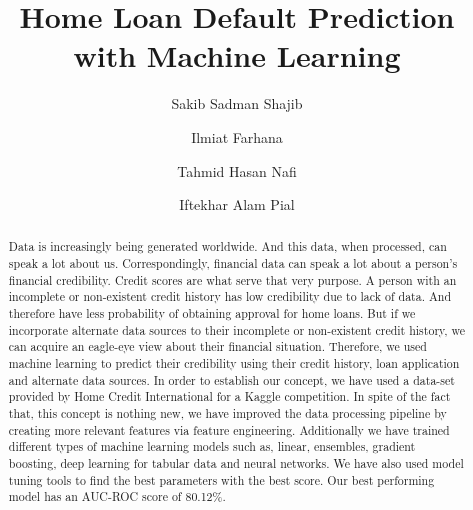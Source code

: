 \documentclass[sigconf, nonacm]{acmart}
\begin{document}
\title{Home Loan Default Prediction with Machine Learning}

\author{Sakib Sadman Shajib}

\author{Ilmiat Farhana}

\author{Tahmid Hasan Nafi}

\author{Iftekhar Alam Pial}

\begin{abstract}

Data is increasingly being generated worldwide. And this data, when processed, can speak a lot about us. Correspondingly, financial data can speak a lot about a person's financial credibility. Credit scores are what serve that very purpose. A person with an incomplete or non-existent credit history has low credibility due to lack of data. And therefore have less probability of obtaining approval for home loans. But if we incorporate alternate data sources to their incomplete or non-existent credit history, we can acquire an eagle-eye view about their financial situation. Therefore, we used machine learning to predict their credibility using their credit history, loan application and alternate data sources. In order to establish our concept, we have used a data-set provided by Home Credit International for a Kaggle competition. In spite of the fact that, this concept is nothing new, we have improved the data processing pipeline by creating more relevant features via feature engineering. Additionally we have trained different types of machine learning models such as, linear, ensembles, gradient boosting, deep learning for tabular data and neural networks. We have also used model tuning tools to find the best parameters with the best score. Our best performing model has an AUC-ROC score of 80.12\%.

\end{abstract}
\end{document}
